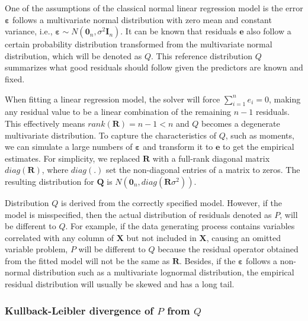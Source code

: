 \documentclass[]{interact}
\theoremstyle{plain}%
\theoremstyle{definition}
\theoremstyle{remark}
\begin{document}
One of the assumptions of the classical normal linear regression model
is the error \(\boldsymbol{\varepsilon}\) follows a multivariate normal
distribution with zero mean and constant variance, i.e.,
\(\boldsymbol{\varepsilon} \sim N(\boldsymbol{0}_n,\sigma^2\boldsymbol{I}_n)\).
It can be known that residuals \(\boldsymbol{e}\) also follow a certain
probability distribution transformed from the multivariate normal
distribution, which will be denoted as \(Q\). This reference
distribution \(Q\) summarizes what good residuals should follow given
the predictors are known and fixed.

When fitting a linear regression model, the solver will force
\(\sum_{i=1}^{n} e_i = 0\), making any residual value to be a linear
combination of the remaining \(n - 1\) residuals. This effectively means
\(rank(\boldsymbol{R}) = n - 1 < n\) and \(Q\) becomes a degenerate
multivariate distribution. To capture the characteristics of \(Q\), such
as moments, we can simulate a large numbers of
\(\boldsymbol{\varepsilon}\) and transform it to \(\boldsymbol{e}\) to
get the empirical estimates. For simplicity, we replaced
\(\boldsymbol{R}\) with a full-rank diagonal matrix
\(diag(\boldsymbol{R})\), where \(diag(.)\) set the non-diagonal entries
of a matrix to zeros. The resulting distribution for \(\boldsymbol{Q}\)
is \(N(\boldsymbol{0}_n, diag(\boldsymbol{R}\sigma^2))\).

Distribution \(Q\) is derived from the correctly specified model.
However, if the model is misspecified, then the actual distribution of
residuals denoted as \(P\), will be different to \(Q\). For example, if
the data generating process contains variables correlated with any
column of \(\boldsymbol{X}\) but not included in \(\boldsymbol{X}\),
causing an omitted variable problem, \(P\) will be different to \(Q\)
because the residual operator obtained from the fitted model will not be
the same as \(\boldsymbol{R}\). Besides, if the
\(\boldsymbol{\varepsilon}\) follows a non-normal distribution such as a
multivariate lognormal distribution, the empirical residual distribution
will usually be skewed and has a long tail.

\hypertarget{kullback-leibler-divergence-of-p-from-q}{%
\subsubsection{\texorpdfstring{Kullback-Leibler divergence of \(P\) from
\(Q\)}{Kullback-Leibler divergence of P from Q}}\label{kullback-leibler-divergence-of-p-from-q}}
\end{document}
